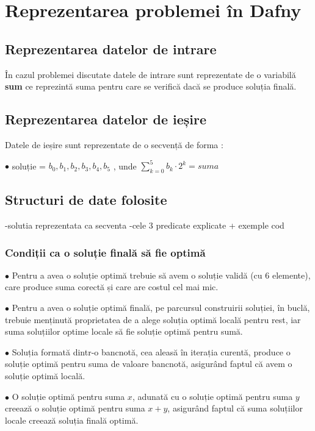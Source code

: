 \chapter{Reprezentarea problemei în Dafny}


\section{ Reprezentarea datelor de intrare }
În cazul problemei discutate datele de intrare sunt reprezentate de o variabilă \textbf{sum} ce reprezintă
 suma pentru care se verifică dacă se produce soluția finală.

\section{ Reprezentarea datelor de ieșire}
Datele de ieșire sunt reprezentate de o secvență de forma : \par
$\bullet$ soluție  = { $b_{0}, b_{1}, b_{2}, b_{3}, b_{4}, b_{5}$} , unde $\sum_{k=0}^{5} b_{k} \cdot 2^{k} = suma $

\section{ Structuri de date folosite}
-solutia reprezentata ca secventa
-cele 3 predicate explicate + exemple cod
\subsection{Condiții ca o soluție finală să fie optimă}
    $\bullet$ Pentru a avea o soluție optimă trebuie să avem o soluție validă (cu 6 elemente), care produce suma corectă
     și care are costul cel mai mic.\par
    $\bullet$ Pentru a avea o soluție optimă finală, pe parcursul construirii soluției, în buclă, trebuie menținută proprietatea
     de a alege soluția optimă locală pentru rest, iar suma soluțiilor optime locale să fie soluție optimă pentru sumă.\par
    $\bullet$ Soluția formată dintr-o bancnotă, cea aleasă în iterația curentă, produce o soluție optimă pentru suma 
    de valoare bancnotă, asigurând faptul că avem o soluție optimă locală.\par
    $\bullet$ O soluție optimă pentru suma $x$, adunată cu o soluție optimă pentru suma $y$ creează o soluție optimă pentru suma $x+y$, 
    asigurând faptul că suma soluțiilor locale creează soluția finală optimă.\par
    